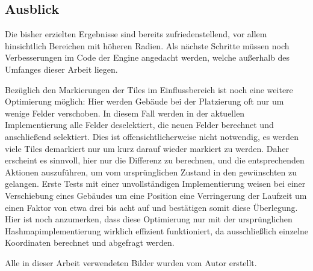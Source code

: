 \documentclass[%
			paper=a4,%
			DIV12,
			liststotoc,
			bibtotoc,
			draft=false,%
			titlepage,
			numbers=noendperiod
			]{scrartcl}
\begin{document}
\subsection{Ausblick}

Die bisher erzielten Ergebnisse sind bereits zufriedenstellend, vor allem hinsichtlich Bereichen mit höheren Radien. Als nächste Schritte müssen noch Verbesserungen im Code der Engine angedacht werden, welche außerhalb des Umfanges dieser Arbeit liegen.

Bezüglich den Markierungen der Tiles im Einflussbereich ist noch eine weitere Optimierung möglich:
Hier werden Gebäude bei der Platzierung oft nur um wenige Felder verschoben.
In diesem Fall werden in der aktuellen Implementierung alle Felder deselektiert, die neuen Felder berechnet und anschließend selektiert.
Dies ist offensichtlicherweise nicht notwendig, es werden viele Tiles demarkiert nur um kurz darauf wieder markiert zu werden. 
Daher erscheint es sinnvoll, hier nur die Differenz zu berechnen, und die entsprechenden Aktionen auszuführen, um vom ursprünglichen Zustand in den gewünschten zu gelangen.
Erste Tests mit einer unvollständigen Implementierung weisen bei einer Verschiebung eines Gebäudes um eine Position eine Verringerung der Laufzeit um einen Faktor von etwa drei bis acht auf und bestätigen somit diese Überlegung. 
Hier ist noch anzumerken, dass diese Optimierung nur mit der ursprünglichen Hashmapimplementierung wirklich effizient funktioniert, da ausschließlich einzelne Koordinaten berechnet und abgefragt werden. 


\clearpage

\newpage

\listoffigures

Alle in dieser Arbeit verwendeten Bilder wurden vom Autor erstellt.

\lstlistoflistings

\listoftables

\newpage

\nocite{*} %

\end{document}
